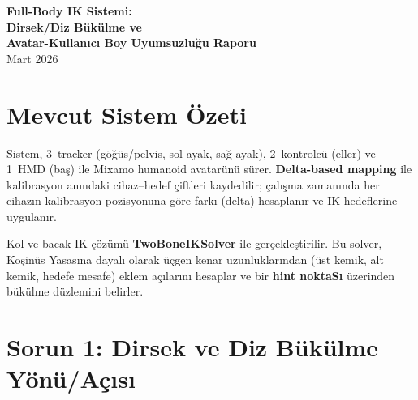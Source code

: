 \documentclass[11pt,a4paper]{article}
\begin{document}
\begin{center}
    {\LARGE\bfseries Full-Body IK Sistemi:\\[4pt]
    Dirsek/Diz B\"uk\"ulme ve\\[4pt]
    Avatar-Kullan{\i}c{\i} Boy Uyumsuzlu\u{g}u Raporu}\\[12pt]
    {\normalsize Mart 2026}
\end{center}

\vspace{6pt}

\begin{abstract}
Bu rapor, HTC VIVE tracker tabanl{\i} full-body IK sisteminde tespit
edilen iki temel sorunu analiz etmektedir: (1)~dirsek ve diz
eklemlerinin yanl{\i}\c{s} d\"uzlemde veya beklenmeyen a\c{c}{\i}da b\"uk\"ulmesi,
(2)~avatar ile kullan{\i}c{\i} aras{\i}ndaki boy ve uzuv orant{\i}
farkl{\i}l{\i}\u{g}{\i}ndan kaynaklanan hareket \"ol\c{c}ek uyumsuzlu\u{g}u.
Her iki sorunun k\"ok nedeni, matematiksel modellenmesi ve
\"onerilen \c{c}\"oz\"umler sunulmaktad{\i}r.
\end{abstract}

\tableofcontents
\vspace{8pt}

\section{Mevcut Sistem \"Ozeti}
\label{sec:sistem}

Sistem, 3~tracker (g\"o\u{g}\"us/pelvis, sol ayak, sa\u{g} ayak), 2~kontrolc\"u
(eller) ve 1~HMD (ba\c{s}) ile Mixamo humanoid avatar\"un\"u s\"urer.
\textbf{Delta-based mapping} ile kalibrasyon an{\i}ndaki cihaz--hedef
\c{c}iftleri kaydedilir; \c{c}al{\i}\c{s}ma zaman{\i}nda her cihaz{\i}n kalibrasyon
pozisyonuna g\"ore fark{\i} (delta) hesaplan{\i}r ve IK hedeflerine
uygulan{\i}r.

Kol ve bacak IK \c{c}\"oz\"um\"u \textbf{TwoBoneIKSolver} ile
ger\c{c}ekle\c{s}tirilir. Bu solver, Ko\c{s}in\"us Yasas{\i}na dayal{\i} olarak
\"u\c{c}gen kenar uzunluklar{\i}ndan (\"ust kemik, alt kemik, hedefe
mesafe) eklem a\c{c}{\i}lar{\i}n{\i} hesaplar ve bir \textbf{hint noktaS{\i}}
\"uzerinden b\"uk\"ulme d\"uzlemini belirler.

\section{Sorun 1: Dirsek ve Diz B\"uk\"ulme Y\"on\"u/A\c{c}{\i}s{\i}}
\label{sec:hint}
\end{document}

